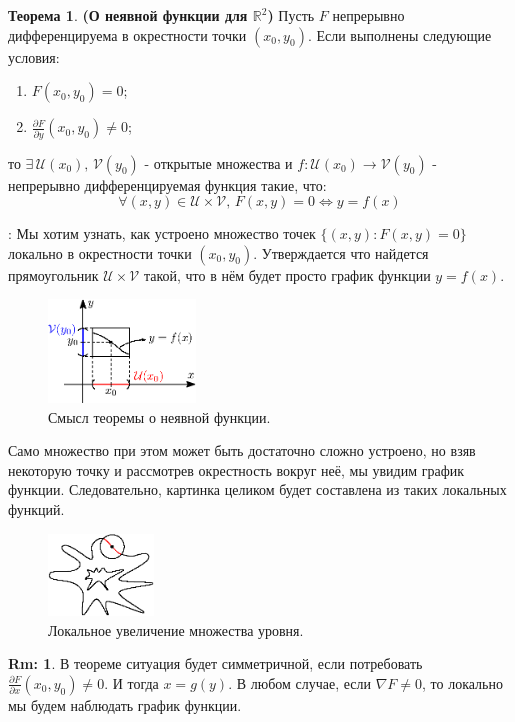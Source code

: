 \documentclass[12pt]{article}
\newcommand{\MR}{\mathbb{R}}
\newcommand{\MU}{\mathcal{U}}
\newcommand{\MV}{\mathcal{V}}
\theoremstyle{definition}
\newtheorem{rem}{Rm:}
\newtheorem{theorem}{Теорема}
\begin{document}
\begin{theorem}\textbf{(О неявной функции для $\MR^2$)} 
	Пусть $F$ непрерывно дифференцируема в окрестности точки $(x_0, y_0)$. Если выполнены следующие условия:
	\begin{enumerate}[label ={\arabic*)}]
		\item $F(x_0,y_0) = 0$;
		\item $\tfrac{\partial F}{\partial y}(x_0,y_0) \neq 0$;
	\end{enumerate}
	то $\exists \, \MU(x_0),\, \MV(y_0)$ - открытые множества и $f \colon \MU(x_0) \to \MV(y_0)$ - непрерывно дифференцируемая функция такие, что: 
	$$
		\forall (x,y) \in \MU \times \MV, \, F(x,y) = 0 \Leftrightarrow y = f(x)
	$$
\end{theorem}
\textbf{}: Мы хотим узнать, как устроено множество точек $\{(x,y)\colon F(x,y) = 0\}$ локально в окрестности точки $(x_0,y_0)$. Утверждается что найдется прямоугольник $\MU \times \MV$ такой, что в нём будет просто график функции $y = f(x)$.
\begin{figure}[H]
	\centering
	\includegraphics[width=0.35\textwidth]{16_1.eps}
	\caption{Смысл теоремы о неявной функции.}
	\label{16_1}
\end{figure}
Само множество при этом может быть достаточно сложно устроено, но взяв некоторую точку и рассмотрев окрестность вокруг неё, мы увидим график функции. Следовательно, картинка целиком будет составлена из таких локальных функций.
\begin{figure}[H]
	\centering
	\includegraphics[width=0.25\textwidth]{16_2.eps}
	\caption{Локальное увеличение множества уровня.}
	\label{16_2}
\end{figure}
\begin{rem}
	В теореме ситуация будет симметричной, если потребовать $\tfrac{\partial F}{\partial x}(x_0,y_0) \neq 0$. И тогда $x = g(y)$. В любом случае, если $\nabla F\neq 0$, то локально мы будем наблюдать график функции.
\end{rem}
\end{document}
